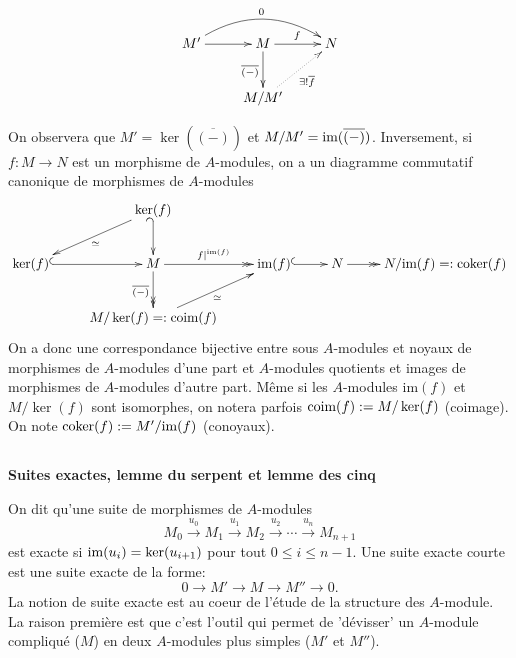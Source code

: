 \documentclass[a4paper, oneside, 12pt]{book}
\theoremstyle{definition} %
\begin{document}
$$\xymatrix{M'\ar[r]\ar@/^1.5pc/[rr]^{0}&M\ar[r]^{f}\ar[d]_{\overline{(-)}}&N\\
&M/M'\ar@{.>}[ur]_{\exists ! \overline{f}}&}$$


 

 On observera que $M'=\ker(\overline{(-)})$ et $M/M'=\hbox{\rm im}(\overline{(-)})$. Inversement, si $f:M\rightarrow N$ est un morphisme de  $A$-modules, on  a un diagramme commutatif canonique de morphismes de $A$-modules
$$\xymatrix{&\ker(f)\ar@{_{(}->}[d]\ar[dl]^\simeq&&&\\
\ker(f)\ar@{^{(}->}[r]&M\ar@{->>}[d]_{\overline{(-)}}\ar@{->>}[r]^{f|^{\hbox{\rm\tiny im}(f)}}&\hbox{\rm im}(f)\ar@{^{(}->}[r]&N\ar@{->>}[r]&N/\hbox{\rm im}(f)=:\hbox{\rm coker}(f)\\
&M/\ker(f)=:\hbox{\rm coim}(f)\ar[ur]_{\simeq}&&}$$
 On a donc une correspondance bijective entre sous $A$-modules et noyaux de morphismes de $A$-modules d'une part et $A$-modules quotients et images de morphismes de $A$-modules d'autre part. Même si les $A$-modules im$(f)$ et $M/\ker(f)$ sont isomorphes, on notera parfois $\hbox{\rm coim}(f):=M/\ker(f)$ (coimage). On note $\hbox{\rm coker}(f):=M'/\hbox{\rm im}(f)$ (conoyaux). \\

\subsection{}\textbf{Suites exactes, lemme du serpent et lemme des cinq}\label{SuiteExacte}


 On dit qu'une suite de morphismes de $A$-modules
$$M_{0}\stackrel{u_{0}}{\rightarrow} M_{1}\stackrel{u_{1}}{\rightarrow} M_{2}\stackrel{u_{2}}{\rightarrow}   \cdots\stackrel{u_{n}}{\rightarrow} M_{n+1}$$
est exacte si $\hbox{\rm im}(u_{i})=\ker(u_{i+1})$ pour tout $0\leq i\leq n-1$.  Une suite exacte courte est une suite exacte de la forme:
$$0\rightarrow M'\rightarrow M\rightarrow M''\rightarrow 0.$$
La notion de suite exacte est au coeur de l'étude de la structure des $A$-module. La raison première est que c'est l'outil qui permet de 'dévisser' un $A$-module compliqué ($M$) en deux $A$-modules plus simples ($M'$ et $M''$).  \\
\end{document}
